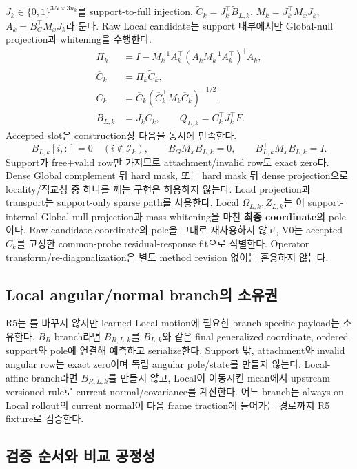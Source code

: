 \documentclass[10pt,a4paper]{article}
\begin{document}
\(J_k\in\{0,1\}^{3N\times3n_k}\)를 support-to-full injection,
\(\widetilde C_k=J_k^\top\widetilde B_{L,k}\),
\(M_k=J_k^\top M_xJ_k\), \(A_k=B_G^\top M_xJ_k\)라 둔다.
Raw Local candidate는 support 내부에서만 Global-null projection과 whitening을 수행한다.
\[
  \begin{aligned}
  \Pi_k&=I-M_k^{-1}A_k^\top
  (A_kM_k^{-1}A_k^\top)^\dagger A_k,\\
  \overline C_k&=\Pi_k\widetilde C_k,\\
  C_k&=\overline C_k
  (\overline C_k^\top M_k\overline C_k)^{-1/2},\\
  B_{L,k}&=J_kC_k,\qquad
  Q_{L,k}=C_k^\top J_k^\top F.
  \end{aligned}
\]
Accepted slot은 construction상 다음을 동시에 만족한다.
\[
  B_{L,k}[i,:]=0\quad(i\notin\mathcal I_k),\qquad
  B_G^\top M_xB_{L,k}=0,\qquad
  B_{L,k}^\top M_xB_{L,k}=I.
\]
Support가 free+valid row만 가지므로 attachment/invalid row도 exact zero다.
Dense Global complement 뒤 hard mask, 또는 hard mask 뒤 dense projection으로 locality/직교성 중 하나를
깨는 구현은 허용하지 않는다. Load projection과 transport는 support-only sparse path를 사용한다.
Local \(\Omega_{L,k},Z_{L,k}\)는 이 support-internal Global-null projection과 mass whitening을 마친
\textbf{최종 coordinate}의 pole이다. Raw candidate coordinate의 pole을 그대로 재사용하지 않고,
V0는 accepted \(C_k\)를 고정한 common-probe residual-response fit으로 식별한다.
Operator transform/re-diagonalization은 별도 method revision 없이는 혼용하지 않는다.

\subsection{Local angular/normal branch의 소유권}

R5는 를 바꾸지 않지만 learned Local motion에 필요한 branch-specific payload는 소유한다.
\(B_R\) branch라면 \(B_{R,L,k}\)를 \(B_{L,k}\)와 같은 final generalized coordinate, ordered support와
pole에 연결해 예측하고 serialize한다. Support 밖, attachment와 invalid angular row는 exact zero이며
독립 angular pole/state를 만들지 않는다. Local-affine branch라면 \(B_{R,L,k}\)를 만들지 않고,
Local이 이동시킨 mean에서 upstream versioned rule로 current normal/covariance를 계산한다.
어느 branch든 always-on Local rollout의 current normal이 다음 frame traction에 들어가는 경로까지 R5 fixture로 검증한다.

\subsection{검증 순서와 비교 공정성}
\end{document}
